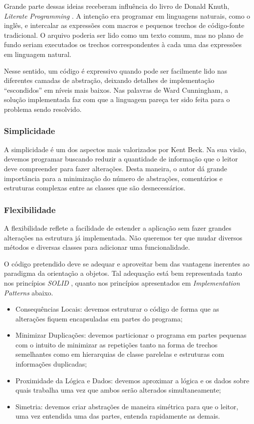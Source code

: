 Grande parte dessas ideias receberam influência do livro de Donald Knuth, \textit{Literate Programming} \citep{Knuth92}. A intenção era programar em linguagens naturais, como o inglês, e intercalar as expressões com macros e pequenos trechos de código-fonte tradicional. O arquivo poderia ser lido como um texto comum, mas no plano de fundo seriam executados os trechos correspondentes à cada uma das expressões em linguagem natural.

Nesse sentido, um código é expressivo quando pode ser facilmente lido nas diferentes camadas de abstração, deixando detalhes de implementação ``escondidos'' em níveis mais baixos. Nas palavras de Ward Cunningham, a solução implementada faz com que a linguagem pareça ter sido feita para o problema sendo resolvido.

\subsubsection{Simplicidade}
A simplicidade é um dos aspectos mais valorizados por Kent Beck. Na sua visão, devemos programar buscando reduzir a quantidade de informação que o leitor deve compreender para fazer alterações. Desta maneira, o autor dá grande importância para a minimização do número de abstrações, comentários e estruturas complexas entre as classes que são desnecessários.

\subsubsection{Flexibilidade}
A flexibilidade reflete a facilidade de estender a aplicação sem fazer grandes alterações na estrutura já implementada. Não queremos ter que mudar diversos métodos e diversas classes para adicionar uma funcionalidade.

O código pretendido deve se adequar e aproveitar bem das vantagens inerentes ao paradigma da orientação a objetos. Tal adequação está bem representada tanto nos princípios \textit{SOLID} \citep{Martin2000}, quanto nos princípios apresentados em \textit{Implementation Patterns} abaixo.

\begin{itemize}
	\item Consequências Locais: devemos estruturar o código de forma que as alterações fiquem encapsuladas em partes do programa;
	\item Minimizar Duplicações: devemos particionar o programa em partes pequenas com o intuito de minimizar as repetições tanto na forma de trechos semelhantes como em hierarquias de classe parelelas e estruturas com informações duplicadas;
	\item Proximidade da Lógica e Dados: devemos aproximar a lógica e os dados sobre quais trabalha uma vez que ambos serão alterados simultaneamente;
	\item Simetria: devemos criar abstrações de maneira simétrica para que o leitor, uma vez entendida uma das partes, entenda rapidamente as demais.
\end{itemize}

